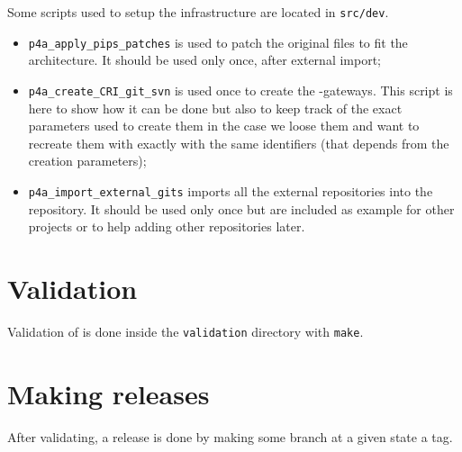 \documentclass[a4paper]{article}
\begin{document}
Some scripts used to setup the infrastructure are located in \texttt{src/dev}.
\begin{itemize}
\item \verb/p4a_apply_pips_patches/ is used to patch the original \Apips
  files to fit the \Apfa architecture. It should be used only once, after
  external \Agit import;
\item \verb/p4a_create_CRI_git_svn/ is used once to create the \Apips
  \Asvn-\Agit gateways. This script is here to show how it can be done but
  also to keep track of the exact parameters used to create them in the
  case we loose them and want to recreate them with exactly with the same
  identifiers (that depends from the creation parameters);
\item \verb/p4a_import_external_gits/ imports all the external \Agit
  repositories into the \Apfa \Agit repository. It should be used only
  once but are included as example for other projects or to help adding
  other repositories later.
\end{itemize}


\section{Validation}
\label{sec:validation}


Validation of \Apfa is done inside the \texttt{validation} directory with
\texttt{make}.


\section{Making releases}
\label{sec:releases}

After validating, a release is done by making some branch at a given state
a tag.
\end{document}
